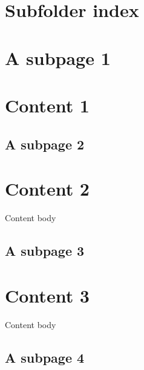 

\pagestyle{empty}
\sphinxmaketitle
\pagestyle{plain}
\sphinxtableofcontents
\pagestyle{normal}
\label{\detokenize{index::doc}}


\sphinxAtStartPar
{}


\chapter{Subfolder index}
\label{\detokenize{subfolder/index:subfolder-index}}\label{\detokenize{subfolder/index::doc}}
\sphinxAtStartPar
{}


\chapter{A subpage 1}
\label{\detokenize{subfolder/asubpage1:a-subpage-1}}\label{\detokenize{subfolder/asubpage1::doc}}

\chapter{Content 1}
\label{\detokenize{content1:content-1}}\label{\detokenize{content1::doc}}

\section{A subpage 2}
\label{\detokenize{subfolder/asubpage2:a-subpage-2}}\label{\detokenize{subfolder/asubpage2::doc}}

\chapter{Content 2}
\label{\detokenize{content2:content-2}}\label{\detokenize{content2::doc}}
\sphinxAtStartPar
Content body


\section{A subpage 3}
\label{\detokenize{subfolder/asubpage3:a-subpage-3}}\label{\detokenize{subfolder/asubpage3::doc}}

\chapter{Content 3}
\label{\detokenize{content3:content-3}}\label{\detokenize{content3::doc}}
\sphinxAtStartPar
Content body


\section{A subpage 4}
\label{\detokenize{subfolder/asubpage4:a-subpage-4}}\label{\detokenize{subfolder/asubpage4::doc}}






\renewcommand{\indexname}{Index}
\printindex
